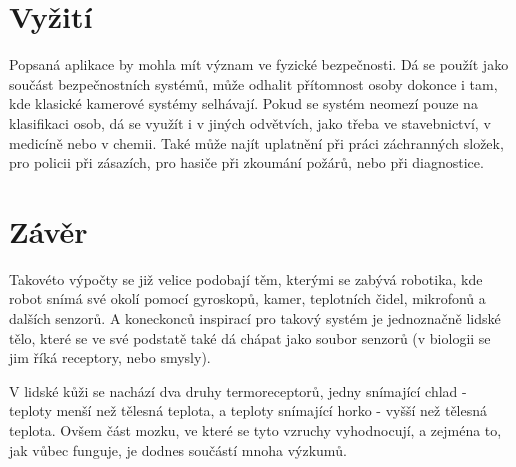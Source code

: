 \documentclass[10pt,a4paper,titlepage]{article}
\begin{document}
  \section{Vyžití}
  Popsaná aplikace by mohla mít význam ve fyzické bezpečnosti. Dá se použít jako součást
  bezpečnostních systémů, může odhalit přítomnost osoby dokonce i tam, kde klasické kamerové
  systémy selhávají. Pokud se systém neomezí pouze na klasifikaci osob, dá se využít i v jiných
  odvětvích, jako třeba ve stavebnictví, v medicíně nebo v chemii. Také může najít uplatnění
  při práci záchranných složek, pro policii při zásazích, pro hasiče při zkoumání požárů,
  nebo při diagnostice.

  \section{Závěr}
  Takovéto výpočty se již velice podobají těm, kterými se zabývá robotika, kde robot snímá své
  okolí pomocí gyroskopů, kamer, teplotních čidel, mikrofonů a dalších senzorů. A koneckonců inspirací
  pro takový systém je jednoznačně lidské tělo, které se ve své podstatě také dá chápat jako soubor
  senzorů (v biologii se jim říká receptory, nebo smysly).
  
  V lidské kůži se nachází dva druhy termoreceptorů, jedny snímající chlad - teploty menší než
  tělesná teplota, a teploty snímající horko - vyšší než tělesná teplota. Ovšem část mozku,
  ve které se tyto vzruchy vyhodnocují, a zejména to, jak vůbec funguje, je dodnes součástí mnoha
  výzkumů.\cite{BodilySenses}

  \newpage
  \printbibliography
\end{document}
